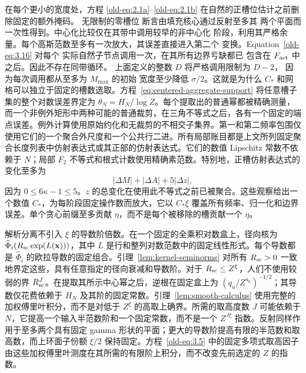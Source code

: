 \documentclass[11pt,a4paper]{article}
\numberwithin{equation}{section}
\numberwithin{figure}{section}
\theoremstyle{definition}
\theoremstyle{remark}
\begin{document}
在每个更小的宽度处，方程
\eqref{old-eq:2.1a}--\eqref{old-eq:2.1b} 在自然的正槽位估计之前删除固定的额外掩码。
无限制的零槽位
断言由填充核心通过反射至多其
两个平面而一次性得到。中心化比较仅在其带中调用较早的非中心化
阶段，利用其严格余量。每个高斯范数至多有一次放大，其误差直接进入第二个
变换。Equation~\eqref{old-eq:3.16} 对每个
实际自然子节点调用一次，在其所有边界亏缺都已
包含在 \(F_{\rm act}\) 中之后。因此不存在同带循环。
上面定义的整数 \(D\) 将严格调用限制为 \(D-2\)，
因为每次调用都从至多为 \(M_{\max}\) 的初始
宽度至少降低 \(\sigma/2\)。这就是为什么 \(C_*\) 和网格可以独立于固定的槽数选取。方程~\eqref{eq:centered-aggregate-support} 将任意槽子集的整个对数误差界定为 \(\theta_N=H_N/\log Z\)。每个提取出的普通幂都被精确测量，而一个非例外矩形中两种可能的普通裁剪，在三角不等式之后，各有一个固定的端点误差。例外计算使用原始约化和无裁剪的不相交子集界。第一和第二频率包围仅使用它们的一个聚合外尺度和一个公共行二进。所有局部账目都是上文所列固定聚合长度列表中仿射表达式或其正部的仿射表达式。它们的数值 Lipschitz 常数不依赖于 \(N\)；局部 \(F_2\) 不等式和根式计数使用精确素范数。特别地，正槽仿射表达式的变化至多为
\begin{equation}
 |\Delta M|+|\Delta A|+5|\Delta z|,
 \label{old-eq:2.1j}
\end{equation}
因为 \(0\le6\kappa-1\le5\)。\(z\) 的总变化在使用此不等式之前已被聚合。这些观察给出一个数值 \(C_*\)，为每阶段固定操作数而放大，它以 \(C_*\xi\) 覆盖所有频率、归一化和边界误差。单个贪心前缀至多贡献 \(\eta\)，而不是每个被移除的槽贡献一个 \(\eta\)。

解析分离不引入 \(\xi\) 的导数阶倍数。在一个固定的全乘积对数盒上，径向核为 \(\widehat\Phi_i(R_{\rm sc}\exp(L(\mathbf x)))\)，其中 \(L\) 是行和整列对数范数中的固定线性形式。每个导数都是 \(\widehat\Phi_i\) 的欧拉导数的固定组合。引理~\ref{lem:kernel-seminorms} 对所有 \(R_{\rm sc}>0\) 一致地界定这些，具有任意指定的径向衰减和导数阶。对于 \(R_{\rm sc}\le Z^\xi\)，人们不使用较弱的界 \(R_{\rm sc}^J\)。在提取其所示中心幂之后，逆根在固定盒上为 \((q_u/Z^{a_0})^{-1/2}\)；其导数仅花费依赖于 \(H_N\) 及其阶的固定常数。引理~\ref{lem:smooth-calculus} 使用完整的加权傅里叶积分，而不是对低于 \(Z^\xi\) 的高取上确界。所需的取高度数 \(J\) 可能依赖于 \(N\)，它提高一个输入半范数阶和一个固定常数，而不是一个 \(Z^{J\xi}\) 指数。反射同样作用于至多两个具有固定 gamma 形状的平面；更大的导数阶提高有限的半范数和取高数，而上环面子份额 \(\xi/2\) 保持固定。方程~\eqref{old-eq:3.5} 中的固定多项式取高因子由这些加权傅里叶测度在其所需的有限阶上积分，而不改变先前选定的 \(Z\) 的指数。
\end{document}

